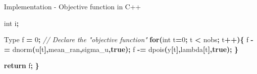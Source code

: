 \documentclass[aspectratio=169]{beamer}
\newenvironment{Shaded}{\begin{snugshade}}{\end{snugshade}}
\newcommand{\CommentTok}[1]{\textcolor[rgb]{0.56,0.35,0.01}{\textit{#1}}}
\newcommand{\ControlFlowTok}[1]{\textcolor[rgb]{0.13,0.29,0.53}{\textbf{#1}}}
\newcommand{\DataTypeTok}[1]{\textcolor[rgb]{0.13,0.29,0.53}{#1}}
\newcommand{\DecValTok}[1]{\textcolor[rgb]{0.00,0.00,0.81}{#1}}
\newcommand{\KeywordTok}[1]{\textcolor[rgb]{0.13,0.29,0.53}{\textbf{#1}}}
\newcommand{\NormalTok}[1]{#1}
\newcommand{\OperatorTok}[1]{\textcolor[rgb]{0.81,0.36,0.00}{\textbf{#1}}}
\begin{document}
\begin{frame}[fragile]{Implementation - Objective function in C++}
\begin{Shaded}
\begin{Highlighting}[]
  \DataTypeTok{int}\NormalTok{ i}\OperatorTok{;}
  
\NormalTok{  Type f }\OperatorTok{=} \DecValTok{0}\OperatorTok{;}                           \CommentTok{// Declare the "objective function"}
  \ControlFlowTok{for}\OperatorTok{(}\DataTypeTok{int}\NormalTok{ t}\OperatorTok{=}\DecValTok{0}\OperatorTok{;}\NormalTok{ t }\OperatorTok{\textless{}}\NormalTok{ nobs}\OperatorTok{;}\NormalTok{ t}\OperatorTok{++)\{}
\NormalTok{    f }\OperatorTok{{-}=}\NormalTok{ dnorm}\OperatorTok{(}\NormalTok{u}\OperatorTok{[}\NormalTok{t}\OperatorTok{],}\NormalTok{mean\_ran}\OperatorTok{,}\NormalTok{sigma\_u}\OperatorTok{,}\KeywordTok{true}\OperatorTok{);}
\NormalTok{    f }\OperatorTok{{-}=}\NormalTok{ dpois}\OperatorTok{(}\NormalTok{y}\OperatorTok{[}\NormalTok{t}\OperatorTok{],}\NormalTok{lambda}\OperatorTok{[}\NormalTok{t}\OperatorTok{],}\KeywordTok{true}\OperatorTok{);}
  \OperatorTok{\}}
  
  \ControlFlowTok{return}\NormalTok{ f}\OperatorTok{;}
\OperatorTok{\}}
\end{Highlighting}
\end{Shaded}

\normalsize
\end{frame}
\end{document}
